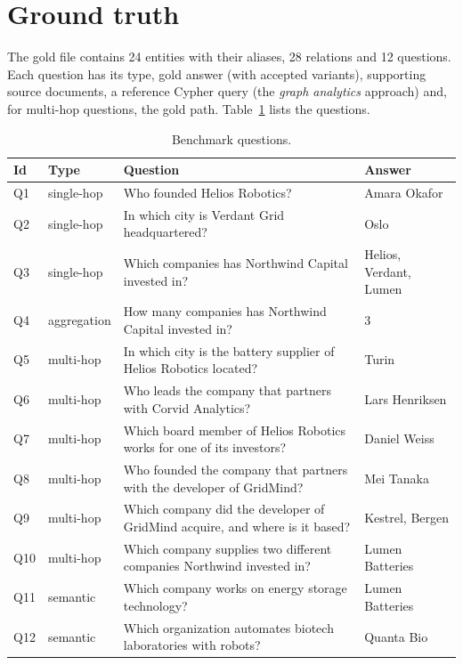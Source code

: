 \documentclass[11pt,a4paper]{report}
\begin{document}
\section{Ground truth}
The gold file contains 24 entities with their aliases, 28 relations and 12 questions. Each question has its type,
gold answer (with accepted variants), supporting source documents, a reference Cypher query (the \emph{graph
analytics} approach) and, for multi-hop questions, the gold path. Table~\ref{tab:questions} lists the questions.

\begin{table}[ht]
\centering
\small
\begin{tabularx}{\linewidth}{llXl}
\toprule
\textbf{Id} & \textbf{Type} & \textbf{Question} & \textbf{Answer} \\
\midrule
Q1 & single-hop & Who founded Helios Robotics? & Amara Okafor \\
Q2 & single-hop & In which city is Verdant Grid headquartered? & Oslo \\
Q3 & single-hop & Which companies has Northwind Capital invested in? & Helios, Verdant, Lumen \\
Q4 & aggregation & How many companies has Northwind Capital invested in? & 3 \\
Q5 & multi-hop & In which city is the battery supplier of Helios Robotics located? & Turin \\
Q6 & multi-hop & Who leads the company that partners with Corvid Analytics? & Lars Henriksen \\
Q7 & multi-hop & Which board member of Helios Robotics works for one of its investors? & Daniel Weiss \\
Q8 & multi-hop & Who founded the company that partners with the developer of GridMind? & Mei Tanaka \\
Q9 & multi-hop & Which company did the developer of GridMind acquire, and where is it based? & Kestrel, Bergen \\
Q10 & multi-hop & Which company supplies two different companies Northwind invested in? & Lumen Batteries \\
Q11 & semantic & Which company works on energy storage technology? & Lumen Batteries \\
Q12 & semantic & Which organization automates biotech laboratories with robots? & Quanta Bio \\
\bottomrule
\end{tabularx}
\caption{Benchmark questions.}
\label{tab:questions}
\end{table}
\end{document}
